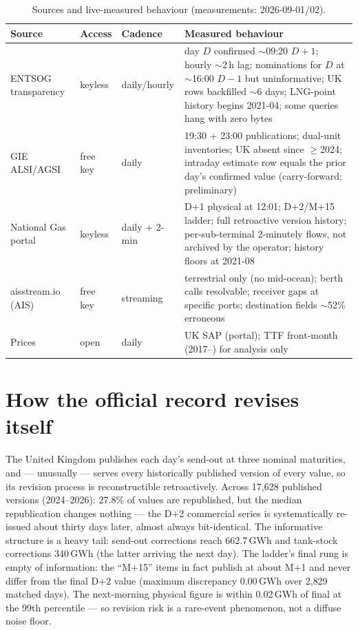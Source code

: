 \documentclass[11pt]{article}
\begin{document}
\begin{table}[t]\centering\small
\begin{tabular}{lllp{4.9cm}}
\toprule
Source & Access & Cadence & Measured behaviour \\
\midrule
ENTSOG transparency & keyless & daily/hourly & day $D$ confirmed $\sim$09:20 $D{+}1$; hourly $\sim$2\,h lag; nominations for $D$ at $\sim$16:00 $D{-}1$ but uninformative; UK rows backfilled $\sim$6 days; LNG-point history begins 2021-04; some queries hang with zero bytes \\
GIE ALSI/AGSI & free key & daily & 19:30 + 23:00 publications; dual-unit inventories; UK absent since $\ge$2024; intraday estimate row equals the prior day's confirmed value (carry-forward; preliminary) \\
National Gas portal & keyless & daily + 2-min & D$+$1 physical at 12:01; D$+$2/M$+$15 ladder; full retroactive version history; per-sub-terminal 2-minutely flows, not archived by the operator; history floors at 2021-08 \\
aisstream.io (AIS) & free key & streaming & terrestrial only (no mid-ocean); berth calls resolvable; receiver gaps at specific ports; destination fields $\sim$52\% erroneous \cite{aisdest} \\
Prices & open & daily & UK SAP (portal); TTF front-month (2017--) for analysis only \\
\bottomrule
\end{tabular}
\caption{Sources and live-measured behaviour (measurements: 2026-09-01/02).}
\label{tab:sources}
\end{table}

\section{How the official record revises itself}
\label{sec:revisions}
The United Kingdom publishes each day's send-out at three nominal
maturities, and --- unusually --- serves every historically published
version of every value, so its revision process is reconstructible
retroactively. Across 17{,}628 published versions (2024--2026): 27.8\% of
values are republished, but the median republication changes nothing ---
the D$+$2 commercial series is systematically re-issued about thirty days
later, almost always bit-identical. The informative structure is a heavy
tail: send-out corrections reach 662.7\,GWh and tank-stock corrections
340\,GWh (the latter arriving the next day). The ladder's final rung is
empty of information: the ``M$+$15'' items in fact publish at about
M$+$1 and never differ from the final D$+$2 value (maximum discrepancy
0.00\,GWh over 2{,}829 matched days). The next-morning physical figure is
within 0.02\,GWh of final at the 99th percentile --- so revision risk is a
rare-event phenomenon, not a diffuse noise floor.
\end{document}
